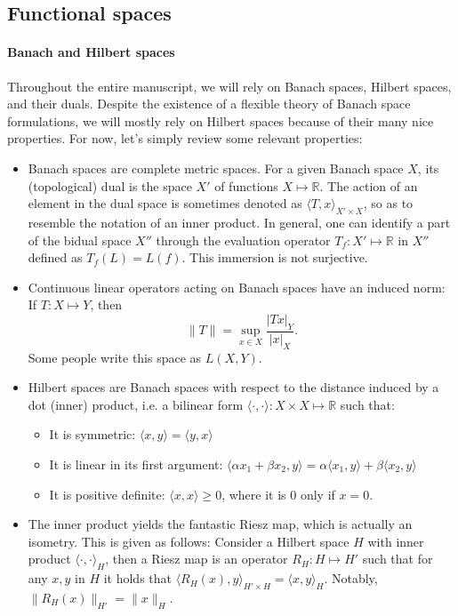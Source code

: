 \documentclass{article}
\newcommand{\R}{\mathbb{R}}
\begin{document}
\subsection{Functional spaces}
\paragraph{Banach and Hilbert spaces} Throughout the entire manuscript, we will rely on Banach spaces, Hilbert spaces, and their duals. Despite the existence of a flexible theory of Banach space formulations, we will mostly rely on Hilbert spaces because of their many nice properties. For now, let's simply review some relevant properties: 
    \begin{itemize}
        \item Banach spaces are complete metric spaces. For a given Banach space $X$, its (topological) dual is the space $X'$ of functions $X\mapsto \R$. The action of an element in the dual space is sometimes denoted as $\langle T, x\rangle_{X'\times X}$, so as to resemble the notation of an inner product. In general, one can identify a part of the bidual space $X''$ through the evaluation operator $T_f:X'\mapsto \R$ in $X''$ defined as $T_f(L) = L(f)$. This immersion is not surjective. 
        \item Continuous linear operators acting on Banach spaces have an induced norm: If $T: X\mapsto Y$, then 
            $$ \| T\| =  \sup_{x\in X}\frac{|Tx|_Y}{|x|_X}. $$
        Some people write this space as $L(X,Y)$. 
        \item Hilbert spaces are Banach spaces with respect to the distance induced by a dot (inner) product, i.e. a bilinear form $\langle\cdot, \cdot \rangle: X\times X\mapsto \R $ such that: 
            \begin{itemize}
                \item It is symmetric: $\langle x,y\rangle = \langle y, x\rangle$
                \item It is linear in its first argument: $\langle \alpha x_1 + \beta x_2, y\rangle=\alpha\langle x_1, y\rangle + \beta\langle x_2, y\rangle$
                \item It is positive definite: $\langle x,x\rangle \geq 0$, where it is 0 only if $x=0$.
            \end{itemize}
        \item The inner product yields the fantastic Riesz map, which is actually an isometry. This is given as follows: Consider a Hilbert space $H$ with inner product $\langle\cdot, \cdot\rangle_H$, then a Riesz map is an operator $R_H: H\mapsto H'$ such that for any $x,y$ in $H$ it holds that $\langle R_H(x), y\rangle_{H'\times H} = \langle x, y\rangle_H$. Notably, $\|R_H(x)\|_{H'} = \| x \|_H$. 

\end{itemize}
\end{document}
